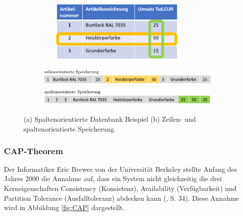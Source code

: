 \begin{figure}[h]
	\begin{subfigure}{\textwidth}
		\centering
		\includegraphics[width=8cm, height = 3cm]{images/SpaltenorientiereDatenbank.png}
		\caption{}
		\label{fig:spalten_zeilen_speicher}
	\end{subfigure}
	\newline
	\begin{subfigure}{\textwidth}
		\centering
		\includegraphics[width=15cm]{images/zeilenspaltenorientiert.png}
		\caption{ }
		\label{fig:spalten_zeilen}
	\end{subfigure}
	\caption[Zeilen- und spaltenorientierte Speicherung]{(a) Spaltenorientierte Datenbank Beispiel (b) Zeilen- und spaltenorientierte Speicherung \protect \footnotemark}
\label{fig:Spaltenorientiert}
\end{figure}


\subsubsection{CAP-Theorem}
Der Informatiker Eric Brewer von der Universität Berkeley stellte Anfang des Jahres 2000 die Annahme auf, dass ein System nicht gleichzeitig die drei Kerneigenschaften Consistency (Konsistenz), Availability (Verfügbarkeit) und Partition Tolerance (Ausfalltoleranz) abdecken kann (\cite{DB1.6}, S. 34). Diese Annahme wird in Abbildung \ref{fig:CAP} dargestellt.
\newline

